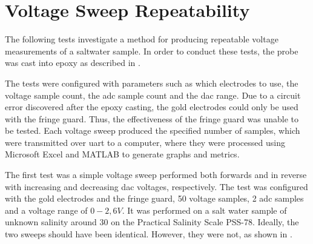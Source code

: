 \section{Voltage Sweep Repeatability}\label{sec:voltage-sweep-repeatability}

The following tests investigate a method for producing repeatable voltage measurements of a saltwater sample.
In order to conduct these tests, the probe was cast into epoxy as described in .

The tests were configured with parameters such as which electrodes to use, the voltage sample count, the \gls{adc} sample count and the \gls{dac} range.
Due to a circuit error discovered after the epoxy casting, the gold electrodes could only be used with the fringe guard.
Thus, the effectiveness of the fringe guard was unable to be tested.
Each voltage sweep produced the specified number of samples, which were transmitted over \gls{uart} to a computer, where they were processed using Microsoft Excel and MATLAB to generate graphs and metrics.

The first test was a simple voltage sweep performed both forwards and in reverse with increasing and decreasing \gls{dac} voltages, respectively.
The test was configured with the gold electrodes and the fringe guard, 50 voltage samples, 2 \gls{adc} samples and a voltage range of $0-2,6V$.
It was performed on a salt water sample of unknown salinity around 30 on the Practical Salinity Scale PSS-78.
Ideally, the two sweeps should have been identical.
However, they were not, as shown in .

